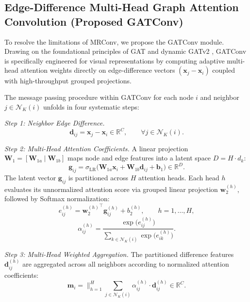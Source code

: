 \documentclass[]{interact}
\theoremstyle{plain}
\theoremstyle{definition}
\theoremstyle{remark}
\begin{document}
\subsection{Edge-Difference Multi-Head Graph Attention Convolution (Proposed GATConv)}
{\color{blue}
\label{sec:gatconv}

To resolve the limitations of MRConv, we propose the GATConv module. Drawing on the foundational principles of GAT \citep{velickovic2018graph} and dynamic GATv2 \citep{brody2022gat}, GATConv is specifically engineered for visual representations by computing adaptive multi-head attention weights directly on edge-difference vectors $(\mathbf{x}_j - \mathbf{x}_i)$ coupled with high-throughput grouped projections.

The message passing procedure within GATConv for each node $i$ and neighbor $j \in \mathcal{N}_K(i)$ unfolds in four systematic steps:

\textit{Step 1: Neighbor Edge Difference.}
\begin{equation}
\mathbf{d}_{ij} = \mathbf{x}_j - \mathbf{x}_i \in \mathbb{R}^{C}, \qquad \forall j \in \mathcal{N}_K(i).
\label{eq:diff}
\end{equation}

\textit{Step 2: Multi-Head Attention Coefficients.} A linear projection $\mathbf{W}_1 = [\mathbf{W}_{1a} \mid \mathbf{W}_{1b}]$ maps node and edge features into a latent space $D = H \cdot d_k$:
\begin{equation}
\mathbf{g}_{ij} = \sigma_{\text{LR}}\!\Big(\mathbf{W}_{1a}\mathbf{x}_i + \mathbf{W}_{1b}\mathbf{d}_{ij} + \mathbf{b}_1\Big) \in \mathbb{R}^{D}.
\label{eq:attn_hidden}
\end{equation}
The latent vector $\mathbf{g}_{ij}$ is partitioned across $H$ attention heads. Each head $h$ evaluates its unnormalized attention score via grouped linear projection $\mathbf{w}_2^{(h)}$, followed by Softmax normalization:
\begin{equation}
e_{ij}^{(h)} = {\mathbf{w}_2^{(h)}}^\top \mathbf{g}_{ij}^{(h)} + b_2^{(h)}, \qquad h = 1, \dots, H,
\label{eq:attn_logit}
\end{equation}
\begin{equation}
\alpha_{ij}^{(h)} = \frac{\exp\!\big(e_{ij}^{(h)}\big)}{\sum_{k \in \mathcal{N}_K(i)} \exp\!\big(e_{ik}^{(h)}\big)}.
\label{eq:softmax}
\end{equation}

\textit{Step 3: Multi-Head Weighted Aggregation.} The partitioned difference features $\mathbf{d}_{ij}^{(h)}$ are aggregated across all neighbors according to normalized attention coefficients:
\begin{equation}
\mathbf{m}_i = \bigg\|_{h=1}^{H} \sum_{j \in \mathcal{N}_K(i)} \alpha_{ij}^{(h)} \cdot \mathbf{d}_{ij}^{(h)} \in \mathbb{R}^{C}.
\label{eq:agg}
\end{equation}

}
\end{document}
